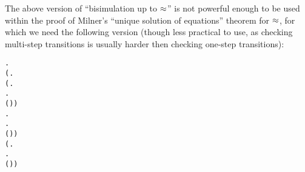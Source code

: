 The above version of ``bisimulation up to $\approx$'' 
is not powerful enough to be used within
the proof of 
Milner's ``unique solution of equations'' theorem for $\approx$, for
which we need 
the
following version (though less practical to use,
as checking multi-step transitions is  usually harder then
checking one-step transitions):
\begin{alltt}
  \HOLSymConst{\HOLTokenDefEquality{}}
  \HOLSymConst{\HOLTokenForall{}} .
         \HOLSymConst{\HOLTokenImp{}}
      (\HOLSymConst{\HOLTokenForall{}}.
           (\HOLSymConst{\HOLTokenForall{}}.
                 \HOLTokenWeakTransBegin{} \HOLTokenWeakTransEnd {} \HOLSymConst{\HOLTokenImp{}}
                \HOLSymConst{\HOLTokenExists{}}.
                     \HOLTokenWeakTransBegin{} \HOLTokenWeakTransEnd {} \HOLSymConst{\HOLTokenConj{}}
                    ( \HOLSymConst{\HOLTokenRCompose{}}  \HOLSymConst{\HOLTokenRCompose{}} )  ) \HOLSymConst{\HOLTokenConj{}}
           \HOLSymConst{\HOLTokenForall{}}.
                \HOLTokenWeakTransBegin{} \HOLTokenWeakTransEnd {} \HOLSymConst{\HOLTokenImp{}}
               \HOLSymConst{\HOLTokenExists{}}.
                    \HOLTokenWeakTransBegin{} \HOLTokenWeakTransEnd {} \HOLSymConst{\HOLTokenConj{}}
                   ( \HOLSymConst{\HOLTokenRCompose{}}  \HOLSymConst{\HOLTokenRCompose{}} )  ) \HOLSymConst{\HOLTokenConj{}}
      (\HOLSymConst{\HOLTokenForall{}}.
            \HOLTokenWeakTransBegin\HOLSymConst{\ensuremath{\tau}}\HOLTokenWeakTransEnd {} \HOLSymConst{\HOLTokenImp{}}
           \HOLSymConst{\HOLTokenExists{}}.
                \HOLSymConst{\HOLTokenEPS}  \HOLSymConst{\HOLTokenConj{}} ( \HOLSymConst{\HOLTokenRCompose{}}  \HOLSymConst{\HOLTokenRCompose{}} )  ) \HOLSymConst{\HOLTokenConj{}}

\end{alltt}
